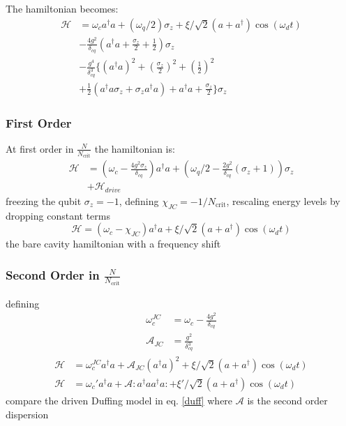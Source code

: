 The hamiltonian becomes:
\begin{align}
    \mathscr{H} &= \omega_c a ^ \dagger a
    + (\omega_q/2) \sigma_z
    +  \xi/\sqrt{2} (a + a^\dagger) \cos(\omega_d t)\\
    &- \frac{4g^2}{\delta_{cq}}\left(a^\dagger a 
    +  \frac{\sigma_z}{2} + \frac{1}{2}\right)\sigma_z\\
    &- \frac{g^4}{\delta_{cq}^3}\Big\{
    \left(a^\dagger a\right)^2
    + \left(\frac{\sigma_z}{2}\right)^2
    + \left(\frac{1}{2}\right)^2\\
    &+ \frac{1}{2} \left(
                    a^\dagger a \sigma_z + \sigma_z a^\dagger a
                  \right)
    + a^\dagger a + \frac{\sigma_z}{2}
    \Big\} 
    \sigma_z
\end{align}
\subsubsection{First Order}
At first order in $\frac{N}{N_{\text{crit}}}$ the hamiltonian is:
\begin{align}
  \mathscr{H} &= (\omega_c
    - \frac{4g^2\sigma_z}{\delta_{cq}}) a ^ \dagger a
    + (\omega_q/2 - \frac{2g^2}{\delta_{cq}} (\sigma_z + 1))\sigma_z\nonumber\\
    &+ \mathscr{H}_{drive}
\end{align}
freezing the qubit $\sigma_z=-1$,
defining $\chi_{JC} = -1/N_{\text{crit}}$,
rescaling energy levels by dropping constant terms
\begin{equation}
    \mathscr{H} = \left(\omega_c-\chi_{JC}\right) a ^ \dagger a
    + \xi/\sqrt{2} ( a + a^\dagger ) \cos(\omega_d t)
\end{equation}
the bare cavity hamiltonian with a frequency shift

\subsubsection{Second Order in $\frac{N}{N_{\text{crit}}}$}
defining
\begin{align}
    \omega_c^{JC} &= \omega_c - \frac{4g^2}{\delta_{cq}}\\
    \mathscr{A}_{JC} &= \frac{g^2}{\delta_{cq}^3}
\end{align}
\begin{align}
    \mathscr{H} &= \omega_c^{JC} a ^ \dagger a
    + \mathscr{A}_{JC}\left(a^\dagger a\right)^2
    + \xi/\sqrt{2} ( a + a^\dagger ) \cos(\omega_d t)\\
    \mathscr{H} &= \omega_c' a^\dagger a
    + \mathscr{A} : a ^ \dagger a a ^ \dagger a :
    + \xi'/\sqrt{2}(a+a^\dagger)\cos(\omega_d t)\label{duff}
\end{align}
compare the driven Duffing model in eq. \ref{duff}
where $\mathscr{A}$ is the second order dispersion \cite{Drummond1979}
